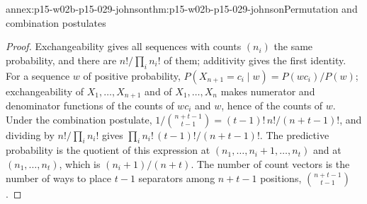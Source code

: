 \begin{annexitem}{annex:p15-w02b-p15-029-johnson}{thm:p15-w02b-p15-029-johnson}{Permutation and combination postulates}
\begin{proof}
Exchangeability gives all sequences with counts \((n_i)\) the same
probability, and there are \(n!/\prod_in_i!\) of them; additivity
gives the first identity. For a sequence \(w\) of positive probability,
\(P(X_{n+1}=c_i\mid w)=P(wc_i)/P(w)\); exchangeability of
\(X_1,\ldots,X_{n+1}\) and of \(X_1,\ldots,X_n\) makes numerator and
denominator functions of the counts of \(wc_i\) and \(w\), hence of
the counts of \(w\). Under the combination postulate,
\(1/\binom{n+t-1}{t-1}=(t-1)!\,n!/(n+t-1)!\), and dividing by
\(n!/\prod_in_i!\) gives \(\prod_in_i!\,(t-1)!/(n+t-1)!\). The
predictive probability is the quotient of this expression at
\((n_1,\ldots,n_i+1,\ldots,n_t)\) and at \((n_1,\ldots,n_t)\), which
is \((n_i+1)/(n+t)\). The number of count vectors is the number of
ways to place \(t-1\) separators among \(n+t-1\) positions,
\(\binom{n+t-1}{t-1}\).
\end{proof}
\end{annexitem}

